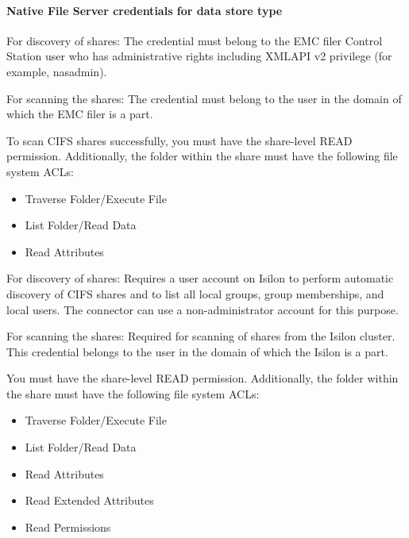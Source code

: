 \documentclass[letterpaper,10pt,english]{sphinxmanual}
\begin{document}
\paragraph{Native File Server credentials for data store type}
\label{\detokenize{mcdmp_app_ug:native-file-server-credentials-for-data-store-type}}

For discovery of shares: The credential must belong to the EMC filer Control Station user who has administrative rights including XMLAPI v2 privilege (for example, nasadmin).

For scanning the shares: The credential must belong to the user in the domain of which the EMC filer is a part.

To scan CIFS shares successfully, you must have the share-level READ permission. Additionally, the folder within the share must have the following file system ACLs:
\begin{itemize}
\item {} 
Traverse Folder/Execute File

\item {} 
List Folder/Read Data

\item {} 
Read Attributes

\end{itemize}


For discovery of shares: Requires a user account on Isilon to perform automatic discovery of CIFS shares and to list all local groups, group memberships, and local users. The connector can use a non-administrator account for this purpose.

For scanning the shares: Required for scanning of shares from the Isilon cluster. This credential belongs to the user in the domain of which the Isilon is a part.

You must have the share-level READ permission. Additionally, the folder within the share must have the following file system ACLs:
\begin{itemize}
\item {} 
Traverse Folder/Execute File

\item {} 
List Folder/Read Data

\item {} 
Read Attributes

\item {} 
Read Extended Attributes

\item {} 
Read Permissions

\end{itemize}
\end{document}
